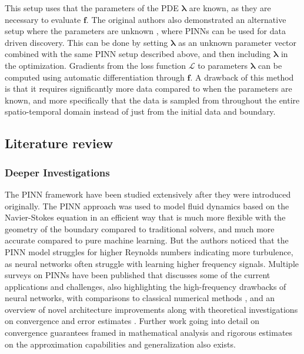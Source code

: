 This setup uses that the parameters of the PDE $\bm{\lambda}$ are known, as they are necessary to evaluate $\bm{f}$. The original authors also demonstrated an alternative setup where the parameters are unknown \cite{pinn2}, where PINNs can be used for data driven discovery. This can be done by setting $\bm{\lambda}$ as an unknown parameter vector combined with the same PINN setup described above, and then including $\bm{\lambda}$ in the optimization. Gradients from the loss function $\mathcal{L}$ to parameters $\bm{\lambda}$ can be computed using automatic differentiation through $\bm{f}$. A drawback of this method is that it requires significantly more data compared to when the parameters are known, and more specifically that the data is sampled from throughout the entire spatio-temporal domain instead of just from the initial data and boundary.

\subsection{Literature review}

\subsubsection{Deeper Investigations}

The PINN framework \cite{pinn1} \cite{pinn2} \cite{pinn} have been studied extensively after they were introduced originally. The PINN approach was used to model fluid dynamics based on the Navier-Stokes equation in an efficient way \cite{hfm} that is much more flexible with the geometry of the boundary compared to traditional solvers, and much more accurate compared to pure machine learning. But the authors noticed that the PINN model struggles for higher Reynolds numbers indicating more turbulence, as neural networks often struggle with learning higher frequency signals. Multiple surveys on PINNs have been published that discusses some of the current applications and challenges, also highlighting the high-frequency drawbacks of neural networks, with comparisons to classical numerical methods \cite{pinnsurvey1}, and an overview of novel architecture improvements along with theoretical investigations on convergence and error estimates \cite{pinnsurvey2}. Further work going into detail on convergence guarantees framed in mathematical analysis \cite{pinnconvergence} and rigorous estimates on the approximation capabilities and generalization \cite{pinngeneralizationapproximation} also exists.

